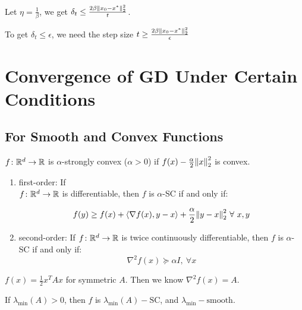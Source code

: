 \begin{remark}
    Let \(\eta = \frac{1}{\beta}\), we get \(\delta_t \leq \frac{2 \beta \norm{x_0 - x^*}_2^2}{t}\). 

    To get \(\delta_t \leq \epsilon\), we need the step size \(t \geq \frac{2 \beta \norm{x_0 - x^*}_2^2}{\epsilon}\)
\end{remark}


\chapter{Convergence of GD Under Certain Conditions}

\section{For Smooth and Convex Functions}

\begin{definition}
    \(f \colon \mathbb{R}^d \to \mathbb{R}\) is \(\alpha\)-strongly convex (\(\alpha > 0\)) if 
    \(f(x) - \frac{\alpha}{2} \norm{x}_2^2\) is convex. 
\end{definition}

\begin{lemma}
    \begin{enumerate}
        \item first-order: If \\ \(f \colon \mathbb{R}^d \to \mathbb{R}\) is differentiable, then 
        \(f\) is \(\alpha\)-SC if and only if: 
        
        \[
            f(y) \geq f(x) + \langle \nabla f(x),  y - x \rangle + \frac{\alpha}{2} \norm{y-x}_2^2 
            \ \forall \ x, y  
        \]
        \item second-order: If \(f \colon \mathbb{R}^d \to \mathbb{R}\) is twice continuously differentiable, 
        then \(f\) is \(\alpha\)-SC if and only if: 
        \[
            \nabla^2 f(x) \succeq \alpha I, \ \forall x   
        \] 
    \end{enumerate} 
\end{lemma}

\begin{eg}
    \(f(x) = \frac{1}{2}x^T A x\) for symmetric \(A\). Then we know \(\nabla^2 f(x) = A\). 

    If \(\lambda_{\text{min}}(A) > 0\), then \(f\) is \(\lambda_{\text{min}}(A)-\text{SC}\), 
    and \(\lambda_{\text{min}}-\text{smooth}\). 
\end{eg}

